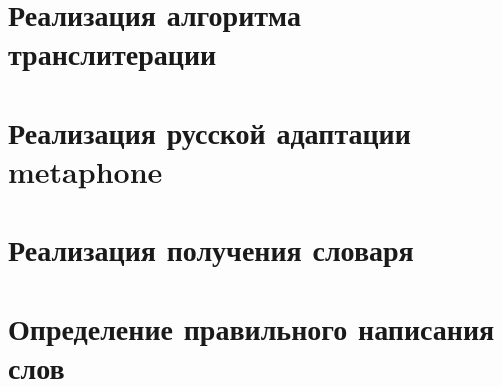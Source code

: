 \appendix

\section{Реализация алгоритма транслитерации}\label{sec:a}



\section{Реализация русской адаптации metaphone}\label{sec:b}





\section{Реализация получения словаря}\label{sec:c}



\section{Определение правильного написания слов}\label{sec:d}










